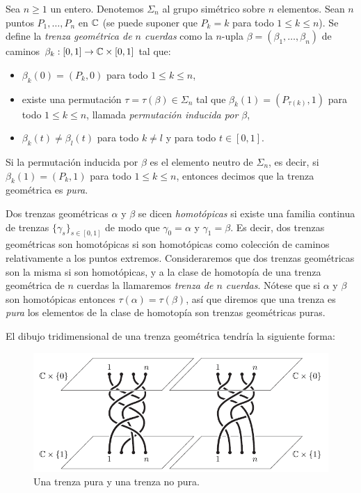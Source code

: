 \documentclass[TFG.tex]{subfiles}
\begin{document}
\begin{defi}\label{geo}
Sea $n\geq 1$ un entero. Denotemos $\Sigma_n$ al grupo simétrico sobre $n$ elementos.  Sean $n$ puntos $P_1,\dots, P_n$ en $\mathbb{C}$ (se puede suponer que $P_k=k$ para todo $1\leq k\leq n$). Se define la \emph{trenza geométrica de $n$ cuerdas} como la $n$-upla $\beta=(\beta_1,\dots,\beta_n)$ de caminos $\beta_k:[0,1]\to\mathbb{C}\times[0,1]$ tal que:
\begin{itemize}
\item $\beta_k(0)=(P_k,0)$ para todo $1\leq k\leq n$,
\item existe una permutación $\tau=\tau(\beta)\in\Sigma_n$ tal que $\beta_k(1)=(P_{\tau(k)},1)$ para todo $1\leq k\leq n$, llamada \emph{permutación inducida por $\beta$},
\item $\beta_k(t)\neq \beta_l(t)$ para todo $k\neq l$ y para todo $t\in[0,1]$.
\end{itemize}
Si la permutación inducida por $\beta$ es el elemento neutro de $\Sigma_n$, es decir, si $\beta_k(1)=(P_k,1)$ para todo $1\leq k\leq n$, entonces decimos que la trenza geométrica es \emph{pura}.

Dos trenzas geométricas $\alpha$ y $\beta$ se dicen \emph{homotópicas} si existe una familia continua de trenzas $\{\gamma_s\}_{s\in[0,1]}$ de modo que $\gamma_0=\alpha$ y $\gamma_1=\beta$. Es decir, dos trenzas geométricas son homotópicas si son homotópicas como colección de caminos relativamente a los puntos extremos. Consideraremos que dos trenzas geométricas son la misma si son homotópicas, y a la clase de homotopía de una trenza geométrica de $n$ cuerdas la llamaremos \emph{trenza de $n$ cuerdas}. Nótese que si $\alpha$ y $\beta$ son homotópicas entonces $\tau(\alpha)=\tau(\beta)$, así que diremos que una trenza es \emph{pura} los elementos de la clase de homotopía son trenzas geométricas puras.
\end{defi}

El dibujo tridimensional de una trenza geométrica tendría la siguiente forma:
\begin{figure}[h!]
\includegraphics[scale=0.7]{Imagenes/hilos}
\caption{Una trenza pura y una trenza no pura.}\label{hilos}
\end{figure}
\end{document}
